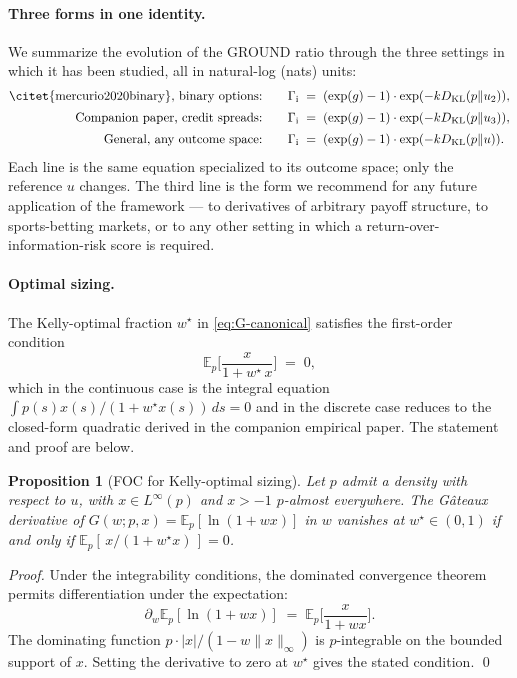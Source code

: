 \documentclass[11pt]{article}
\newtheorem{proposition}[theorem]{Proposition}
\theoremstyle{definition}
\theoremstyle{remark}
\newcommand{\E}{\mathbb{E}}
\newcommand{\G}{g}
\newcommand{\KL}{D_{\mathrm{KL}}}
\newcommand{\GROUND}{\Gamma_{\mathrm{i}}}
\begin{document}
\paragraph{Three forms in one identity.} We summarize the evolution
of the GROUND ratio through the three settings in which it has been
studied, all in natural-log (nats) units:
\begin{align*}
\text{\citet{mercurio2020binary}, binary options:} \qquad
&\GROUND \;=\; (\exp(\G) - 1) \cdot \exp(-k \KL(p \| u_2)), \\[2pt]
\text{Companion paper, credit spreads:} \qquad
&\GROUND \;=\; (\exp(\G) - 1) \cdot \exp(-k \KL(p \| u_3)), \\[2pt]
\text{General, any outcome space:} \qquad
&\GROUND \;=\; (\exp(\G) - 1) \cdot \exp(-k \KL(p \| u)).
\end{align*}
Each line is the same equation specialized to its outcome space; only
the reference $u$ changes. The third line is the form we recommend
for any future application of the framework --- to derivatives of
arbitrary payoff structure, to sports-betting markets, or to any other
setting in which a return-over-information-risk score is required.

\paragraph{Optimal sizing.} The Kelly-optimal fraction $w^\star$
in \eqref{eq:G-canonical} satisfies the first-order condition
\begin{equation}
\E_p\!\biggl[\frac{x}{1 + w^\star \, x}\biggr] \;=\; 0,
\label{eq:cts-foc}
\end{equation}
which in the continuous case is the integral equation
$\int p(s) x(s) / (1 + w^\star x(s)) \, ds = 0$ and in the discrete
case reduces to the closed-form quadratic derived in the companion
empirical paper. The statement and proof are below.

\begin{proposition}[FOC for Kelly-optimal sizing]\label{prop:cts-foc}
Let $p$ admit a density with respect to $u$, with
$x \in L^\infty(p)$ and $x > -1$ $p$-almost everywhere. The Gâteaux
derivative of $G(w; p, x) = \E_p[\ln(1 + w x)]$ in $w$ vanishes at
$w^\star \in (0, 1)$ if and only if
$\E_p[\,x / (1 + w^\star x)\,] = 0$.
\end{proposition}

\begin{proof}
Under the integrability conditions, the dominated convergence
theorem permits differentiation under the expectation:
\begin{equation*}
\partial_w \E_p[\ln(1 + w x)]
   \;=\; \E_p\!\biggl[\frac{x}{1 + w x}\biggr].
\end{equation*}
The dominating function $p \cdot |x| / (1 - w \|x\|_\infty)$ is
$p$-integrable on the bounded support of $x$. Setting the derivative
to zero at $w^\star$ gives the stated condition.
\qed
\end{proof}
\end{document}
